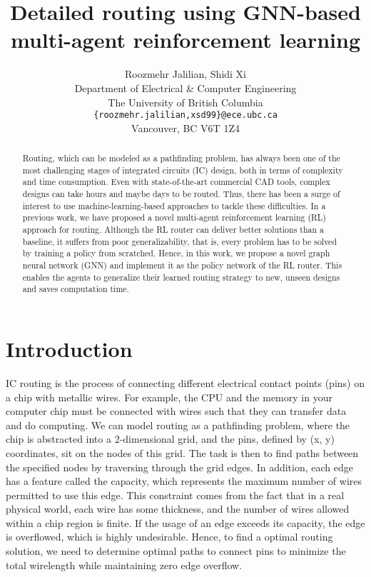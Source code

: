 \documentclass[letterpaper]{article}
\title{Detailed routing using GNN-based multi-agent reinforcement learning}
\author{%
    Roozmehr Jalilian, Shidi Xi \\
    Department of Electrical \& Computer Engineering \\
    The University of British Columbia \\
    \texttt{\{roozmehr.jalilian,xsd99\}@ece.ubc.ca} \\
    Vancouver, BC V6T 1Z4
}
\begin{document}
\maketitle


\begin{abstract}
Routing, which can be modeled as a pathfinding problem,  has always been one of the most challenging stages of integrated circuits (IC) design, both in terms of complexity and time consumption. Even with state-of-the-art commercial CAD tools, complex designs can take hours and maybe days to be routed. Thus, there has been a surge of interest to use machine-learning-based approaches to tackle these difficulties. In a previous work, we have proposed a novel multi-agent reinforcement learning (RL) approach for routing. Although the RL router can deliver better solutions than a baseline, it suffers from poor generalizability, that is, every problem has to be solved by training a policy from scratched. Hence, in this work, we propose a novel graph neural network (GNN) and implement it as the policy network of the RL router. This enables the agents to generalize their learned routing strategy to new, unseen designs and saves computation time.
\end{abstract}

\section{Introduction}
IC routing is the process of connecting different electrical contact points (pins) on a chip with metallic wires. For example, the CPU and the memory in your computer chip must be connected with wires such that they can transfer data and do computing. We can model routing as a pathfinding problem, where the chip is abstracted into a 2-dimensional grid, and the pins, defined by (x, y) coordinates, sit on the nodes of this grid. The task is then to find paths between the specified nodes by traversing through the grid edges. In addition, each edge has a feature called the capacity, which represents the maximum number of wires permitted to use this edge. This constraint comes from the fact that in a real physical world, each wire has some thickness, and the number of wires allowed within a chip region is finite. If the usage of an edge exceeds its capacity, the edge is overflowed, which is highly undesirable. Hence, to find a optimal routing solution, we need to determine optimal paths to connect pins to minimize the total wirelength while maintaining zero edge overflow.
\end{document}
